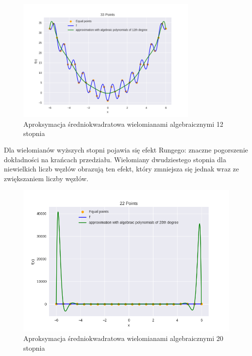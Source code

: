 \documentclass{article}
\begin{document}
\begin{figure}[H]
    \centering
    \includegraphics[width=0.8\textwidth]{img/algpoly_12_33.png}
    \caption{Aproksymacja średniokwadratowa wielomianami algebraicznymi 12 stopnia}
\end{figure}

Dla wielomianów wyższych stopni pojawia się efekt Rungego: znaczne pogorszenie dokładności na krańcach przedziału.
Wielomiany dwudziestego stopnia dla niewielkich liczb węzłów obrazują ten efekt, który zmniejsza się jednak wraz ze zwiększaniem
liczby węzłów.

\begin{figure}[H]
    \centering
    \includegraphics[width=\textwidth]{img/algpoly_20_22.png}
    \caption{Aproksymacja średniokwadratowa wielomianami algebraicznymi 20 stopnia}
\end{figure}
\end{document}
